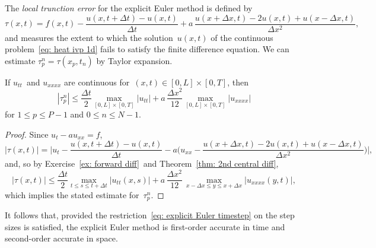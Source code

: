 The \emph{local trunction error} for the explicit Euler method is defined by
\begin{equation}\label{eq: tau explicit Euler}
\tau(x,t)=f(x,t)-\frac{u(x,t+\Delta t)-u(x,t)}{\Delta t}
	+a\,\frac{u(x+\Delta x,t)-2u(x,t)+u(x-\Delta x,t)}{\Delta x^2},
\end{equation}
and measures the extent to which the solution~$u(x,t)$ of the continuous 
problem~\eqref{eq: heat ivp 1d} fails to satisfy the finite difference equation.
We can estimate $\tau^n_p=\tau(x_p,t_n)$ by Taylor expansion.

\begin{lemma}\label{lem: tau explicit Euler}
If $u_{tt}$~and $u_{xxxx}$ are continuous for~$(x,t)\in[0,L]\times[0,T]$, then
\[
|\tau^n_p|\le\frac{\Delta t}{2}\max_{[0,L]\times[0,T]}|u_{tt}|
	+a\,\frac{\Delta x^2}{12}\max_{[0,L]\times[0,T]}|u_{xxxx}|
\]
for $1\le p\le P-1$ and $0\le n\le N-1$.
\end{lemma}
\begin{proof}
Since $u_t-au_{xx}=f$,
\[
|\tau(x,t)|=\biggl|u_t-\frac{u(x,t+\Delta t)-u(x,t)}{\Delta t}
	-a\biggl(u_{xx}-\frac{u(x+\Delta x,t)-2u(x,t)+u(x-\Delta x,t)}{\Delta x^2}
\biggr)\biggr|,
\]
and, so by Exercise~\ref{ex: forward diff}~and 
Theorem~\ref{thm: 2nd central diff},
\[
|\tau(x,t)|\le\frac{\Delta t}{2}\max_{t\le s\le t+\Delta t}|u_{tt}(x,s)|
	+a\,\frac{\Delta x^2}{12}\,
	\max_{x-\Delta x\le y\le x+\Delta x}|u_{xxxx}(y,t)|,
\]
which implies the stated estimate for~$\tau^n_p$. 
\end{proof}

It follows that, provided the restriction~\eqref{eq: explicit Euler timestep}
on the step sizes is satisfied, the explicit Euler method is first-order 
accurate in time and second-order accurate in space.

